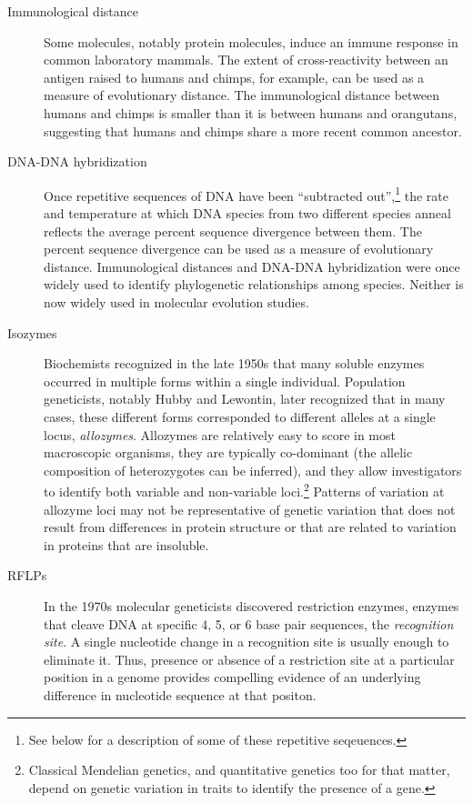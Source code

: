 \begin{description}

\item[Immunological distance] Some molecules, notably protein
  molecules, induce an immune response in common laboratory
  mammals. The extent of cross-reactivity between an antigen raised to
  humans and chimps, for example, can be used as a measure of
  evolutionary distance. The immunological distance between humans and
  chimps is smaller than it is between humans and orangutans,
  suggesting that humans and chimps share a more recent common
  ancestor.

\item[DNA-DNA hybridization] Once repetitive sequences of DNA have
  been ``subtracted out'',\footnote{See below for a description of
    some of these repetitive seqeuences.} the rate and temperature at
  which DNA species from two different species anneal reflects the
  average percent sequence divergence between them. The percent
  sequence divergence can be used as a measure of evolutionary
  distance. Immunological distances and DNA-DNA hybridization were
  once widely used to identify phylogenetic relationships among
  species. Neither is now widely used in molecular evolution studies.

\item[Isozymes] Biochemists recognized in the late 1950s that many
  soluble enzymes occurred in multiple forms within a single
  individual. Population geneticists, notably Hubby and Lewontin, later
  recognized that in many cases, these different forms corresponded to
  different alleles at a single locus, {\it allozymes}. Allozymes are
  relatively easy to score in most macroscopic organisms, they are
  typically co-dominant (the allelic composition of heterozygotes can
  be inferred), and they allow investigators to identify both variable
  and non-variable loci.\footnote{Classical Mendelian genetics, and
    quantitative genetics too for that matter, depend on genetic
    variation in traits to identify the presence of a gene.} Patterns
  of variation at allozyme loci may not be representative of genetic
  variation that does not result from differences in protein structure
  or that are related to variation in proteins that are insoluble.

\item[RFLPs] In the 1970s molecular geneticists discovered restriction
  enzymes, enzymes that cleave DNA at specific 4, 5, or 6 base pair
  sequences, the {\it recognition site}. A single nucleotide change in
  a recognition site is usually enough to eliminate it. Thus, presence
  or absence of a restriction site at a particular position in a
  genome provides compelling evidence of an underlying difference in
  nucleotide sequence at that positon.


\end{description}

